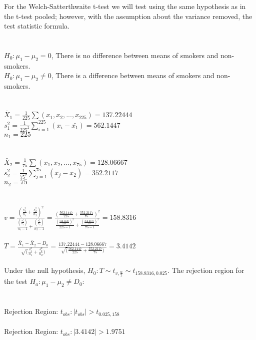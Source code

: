 \documentclass[
]{article}
\begin{document}
For the Welch-Satterthwaite t-test we will test using the same
hypothesis as in the t-test pooled; however, with the assumption about
the variance removed, the test statistic formula.\\
~\\
~\\
\(H_{0}: \mu_{1}-\mu_{2} = 0\), There is no difference between means of
smokers and non-smokers.\\
\(H_{0}: \mu_{1}-\mu_{2} ≠ 0\), There is a difference between means of
smokers and non-smokers.\\
~\\
~\\
\(\bar{X}_{1} = \frac{1}{225}\sum(x_{1},x_{2},...,x_{225}) = 137.22444\)\\
\(s^2_{1} = \frac{1}{225^2}\sum^{225}_{i=1}(x_{i}-\bar{x_{1}}) = 562.1447\)\\
\(n_{1} = 225\)\\
~\\
~\\
\(\bar{X}_{2} = \frac{1}{75}\sum(x_{1},x_{2},...,x_{75}) = 128.06667\)\\
\(s^2_{2} = \frac{1}{75^2}\sum^{75}_{j=1}(x_{j}-\bar{x_{2}}) = 352.2117\)\\
\(n_{2} = 75\)\\
~\\
~\\
\(v = \frac{(\frac{s^2_{1}}{n_{1}}+\frac{s^2_{2}}{n_{2}})^2}{\frac{(\frac{s^2_{1}}{n_{1}})}{n_{1}-1}+{\frac{(\frac{s^2_{2}}{n_{2}})}{n_{2}-1}}} = \frac{(\frac{562.1447}{225}+\frac{352.2117}{75})^2}{\frac{(\frac{562.1447}{225})^2}{225-1}+{\frac{(\frac{352.2117}{75})^2}{75-1}}} = 158.8316\)\\
~\\
\(T = \frac{\bar{X}_1-\bar{X}_2-D_{0}}{\sqrt(\frac{s^2_1}{n_{1}}+\frac{s^2_2}{n_{2}})} = \frac{137.22444-128.06667}{\sqrt(\frac{562.1447}{225}+\frac{352.2117}{75})} = 3.4142\)\\
~\\
Under the null hypothesis,
\(H_{0}: T \sim t_{v,\frac{\alpha}{2}} \sim t_{158.8316,0.025}\). The
rejection region for the test \(H_{a}: \mu_{1}-\mu_{2} ≠ D_{0}:\)\\
~\\
~\\
Rejection Region: \({t_{obs} : |t_{obs}| > t_{0.025,158}}\)\\
~\\
Rejection Region: \({t_{obs} : |3.4142| > 1.9751}\)\\
~\\
\end{document}
